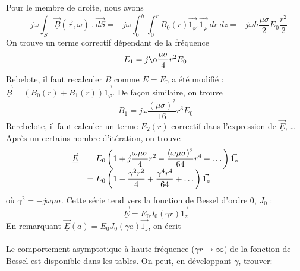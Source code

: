 Pour le membre de droite, nous avons
\begin{equation}
-j\omega \int_S \vec{\underline{B}}(\vec{r},\omega)\ .\ \vec{dS} = -j\omega \int_0^h\int_0^r 
B_0(r)\vec{1_\varphi}.\vec{1_\varphi}\ dr\ dz = -j\omega h\dfrac{\mu\sigma}{2}E_0\dfrac{r^2}{2}
\end{equation}
On trouve un terme correctif dépendant de la fréquence
\begin{equation}
E_1 = j\o
\dfrac{\mu\sigma}{4}r^2E_0
\end{equation}
Rebelote, il faut recalculer $B$ comme $E=E_0$ a été modifié : $\vec{\underline{B}} = (B_0(r)+
B_1(r))\vec{1_\varphi}$. De façon similaire, on trouve
\begin{equation}
B_1=j\omega\dfrac{(\mu\sigma)^2}{16}r^3E_0
\end{equation}
Rerebelote, il faut calculer un terme $E_2(r)$ correctif dans l'expression de $\vec{\underline{E}}$, 
\dots Après un certains nombre d'itération, on trouve
\begin{equation}
\begin{array}{ll}
\vec{\underline{E}} &= \DS E_0\left(1+j\dfrac{\omega\mu\sigma}{4}r^2-\dfrac{(\omega\mu\sigma)^2}{64}r^4
+\dots\right)\vec{1_z}\\
&= \DS E_0\left(1-\dfrac{\gamma^2r^2}{4}+\dfrac{\gamma^4r^4}{64}+\dots\right)\vec{1_z}
\end{array}
\end{equation}
où $\gamma^2=-j\omega\mu\sigma$. Cette série tend vers la fonction de Bessel d'ordre 0, $J_0$ :
\begin{equation}
\vec{\underline{E}} = E_0J_0(\gamma r)\vec{1_z}
\end{equation}
En remarquant $\vec{\underline{E}}(a) = E_0J_0(\gamma a)\vec{1_z}$, on écrit\\

\ \\

Le comportement asymptotique à haute fréquence ($\gamma r \rightarrow\infty$) de la fonction de 
Bessel est disponible dans les tables. On peut, en développant $\gamma$, trouver:\\
\ \\

